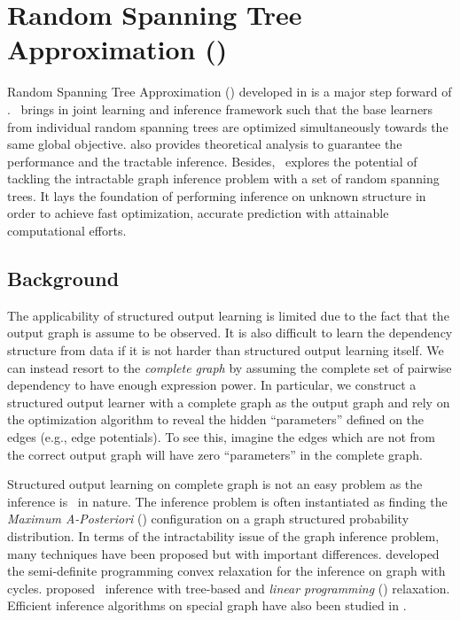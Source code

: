 {%
%
\section{Random Spanning Tree Approximation (\rta)}\label{sc_su14c}

Random Spanning Tree Approximation (\rta) developed in  is a major step forward of \mam.
\rta\ brings in joint learning and inference framework such that the base learners from individual random spanning trees are optimized simultaneously towards the same global objective.
 also provides theoretical analysis to guarantee the performance and the tractable inference.
Besides, \rta\ explores the potential of tackling the intractable graph inference problem with a set of random spanning trees.
It lays the foundation of performing inference on unknown structure in order to achieve fast optimization, accurate prediction with attainable computational efforts.



%
%
\subsection{Background}

The applicability of structured output learning is limited due to the fact that the output graph is assume to be observed.
It is also difficult to learn the dependency structure from data \citep{Chickering94learning} if it is not harder than structured output learning itself.
We can instead resort to the \textit{complete graph} by assuming the complete set of pairwise dependency to have enough expression power.
In particular, we construct a structured output learner with a complete graph as the output graph and rely on the optimization algorithm to reveal the hidden ``parameters'' defined on the edges (e.g., edge potentials).
To see this, imagine the edges which are not from the correct output graph will have zero ``parameters'' in the complete graph.

Structured output learning on complete graph is not an easy problem as the inference is \nphard\ in nature.
The inference problem is often instantiated as finding the \textit{Maximum A-Posteriori} (\map) configuration on a graph structured probability distribution.
In terms of the intractability issue of the graph inference problem, many techniques have been proposed but with important differences.
\citet{Jordan04semiefinite} developed the semi-definite programming convex relaxation for the inference on graph with cycles.
\citet{Wainwright05map} proposed \map\ inference with tree-based and \textit{linear programming} (\lp) relaxation.
Efficient inference algorithms on special graph have also been studied in \citep{Globerson07approximate}.

}

